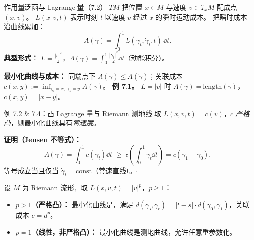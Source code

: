 \begin{frame}{作用量泛函与 Lagrange 量（7.2）}
   $TM$ 把位置 $x\in M$ 与速度 $v\in T_{x}M$ 配成点 $(x,v)$。
   $L(x,v,t)$ 表示时刻 $t$ 以速度 $v$ 经过 $x$ 的瞬时运动成本。
  把瞬时成本沿曲线累加：
  \[
    A(\gamma) = \int_{0}^{1} L(\gamma_{t},\dot{\gamma}_{t},t)\,\dd t.
  \]
  \textbf{典型形式：} $L=\tfrac{|v|^{2}}{2}$，$A(\gamma)=\int_{0}^{1}\tfrac{|\dot{\gamma}_{t}|^{2}}{2}\dd t$（动能积分）。

  \textbf{最小化曲线与成本：} 同端点下 $A(\gamma)\le A(\tilde{\gamma})$；关联成本
  $c(x,y):=\inf_{\gamma_{0}=x,\,\gamma_{1}=y}A(\gamma)$。
  \textbf{例 7.1。} $L=|v|$ 时 $A(\gamma)=\mathrm{length}(\gamma)$，$c(x,y)=|x-y|$。

\end{frame}

\begin{frame}{例 7.2 \& 7.4：凸 Lagrange 量与 Riemann 测地线}
   取 $L(x,v,t)=c(v)$，$c$ \emph{严格凸}，则最小化曲线具有\emph{常速度}。

  \textbf{证明（Jensen 不等式）：}
  \[
    A(\gamma)=\int_{0}^{1}c(\dot{\gamma}_{t})\dd t
    \;\ge\; c\!\left(\int_{0}^{1}\dot{\gamma}_{t}\dd t\right)
    = c(\gamma_{1}-\gamma_{0}).
  \]
  等号成立当且仅当 $\dot{\gamma}_{t}=\mathrm{const}$（常速直线）。$\square$

  \vspace{3pt}
   设 $M$ 为 Riemann 流形，取 $L(x,v,t)=|v|^{p}$，$p\ge1$：
  \begin{itemize}
    \item \textbf{$p>1$（严格凸）：} 最小化曲线是，满足
      $d(\gamma_{s},\gamma_{t})=|t-s|\cdot d(\gamma_{0},\gamma_{1})$，关联成本 $c=d^{p}$。
    \item \textbf{$p=1$（线性，非严格凸）：} 最小化曲线是测地曲线，允许任意重参数化。
  \end{itemize}

\end{frame}

